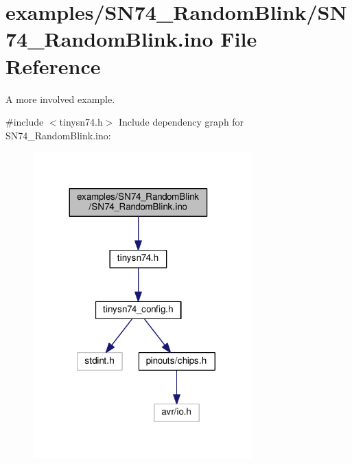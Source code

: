 \hypertarget{SN74__RandomBlink_8ino}{}\section{examples/\+S\+N74\+\_\+\+Random\+Blink/\+S\+N74\+\_\+\+Random\+Blink.ino File Reference}
\label{SN74__RandomBlink_8ino}


A more involved example.  


{\ttfamily \#include $<$tinysn74.\+h$>$}\newline
Include dependency graph for S\+N74\+\_\+\+Random\+Blink.\+ino\+:\nopagebreak
\begin{figure}[H]
\begin{center}
\leavevmode
\includegraphics[width=239pt]{SN74__RandomBlink_8ino__incl}
\end{center}
\end{figure}

